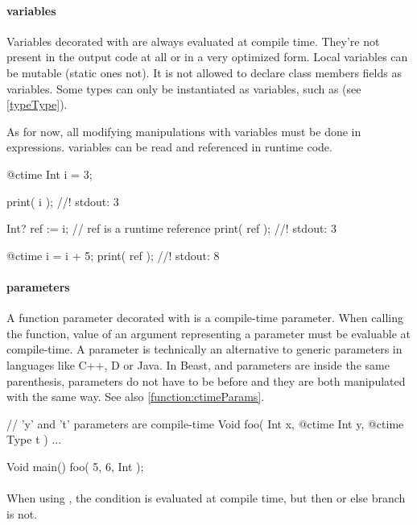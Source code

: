 \paragraph{\ctime variables}
Variables decorated with \ctime are always evaluated at compile time. They're not present in the output code at all or in a very optimized form. Local \ctime variables can be mutable (static ones not). It is not allowed to declare class members fields as \ctime variables. Some types can only be instantiated as \ctime variables, such as  (see \autoref{typeType}).

As for now, all modifying manipulations with \ctime variables must be done in \ctime expressions. \ctime variables can be read and referenced in runtime code.

\begin{code}
@ctime Int i = 3;

print( i ); //! stdout: 3

Int? ref := i; // ref is a runtime reference
print( ref ); //! stdout: 3

@ctime i = i + 5;
print( ref ); //! stdout: 8
\end{code}

\paragraph{ parameters}
A function parameter decorated with  is a compile-time parameter. When calling the function, value of an argument representing a \ctime parameter must be evaluable at compile-time. A \ctime parameter is technically an alternative to generic parameters in languages like C++, D or Java. In Beast, \ctime and \nonctime parameters are inside the same parenthesis, \ctime parameters do not have to be before \nonctime and they are both manipulated with the same way. See also \autoref{function:ctimeParams}.

\begin{code}
// 'y' and 't' parameters are compile-time
Void foo( Int x, @ctime Int y, @ctime Type t ) { ... }

Void main() {
	foo( 5, 6, Int );
}
\end{code}

\paragraph{}
When using , the condition is evaluated at compile time, but then or else branch is not.

